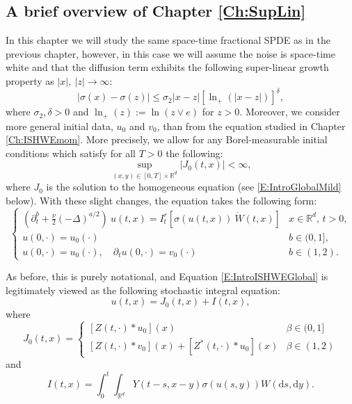 \documentclass[12pt]{report}
\theoremstyle{plain}
\theoremstyle{definition}
\numberwithin{equation}{section}
\newcommand{\R}{\mathbb{R}}
\newcommand{\ud}{\ensuremath{ \mathrm{d} }}
\begin{document}
\subsection{A brief overview of Chapter \ref{Ch:SupLin}}
In this chapter we will study the same space-time fractional SPDE as in the previous chapter, however, in this case we will assume the noise is space-time white and that the diffusion term exhibits the following super-linear growth property as $|x|,\: |z| \to \infty$:
\[
		|\sigma(x)-\sigma(z)| \le \sigma_2|x-z|[\ln_+(|x-z|)]^{\delta},
\]
where $\sigma_2, \delta >0$ and $\ln_+(z) := \ln(z \vee e)$ for $z >0$. Moreover, we consider more general initial data, $u_0$ and $v_0$, than from the equation studied in Chapter \ref{Ch:ISHWEmom}. More precisely, we allow for any Borel-measurable initial conditions which satisfy for all $T>0$ the following:
	\[
		\sup_{(x,y) \in [0,T] \times \R^d} |J_0(t,x)| < \infty, 
	\]
where $J_0$ is the solution to the homogeneous equation (see \eqref{E:IntroGlobalMild} below). With these slight changes, the equation takes the following form:
\begin{equation} \label{E:IntroISHWEGlobal}
\begin{cases}
\left(\partial^b_t + \frac{\nu}{2}(-\Delta)^{a/2}\right)\: u(t,x) = I^r_t \left[\sigma( u(t,x))\: \dot W(t,x) \right] & \text{$x\in \R^d$, $t>0$}, \\
u(0,\cdot) = u_0(\cdot)                                                                                                           & b \in (0,1],               \\
u(0,\cdot) = u_0(\cdot), \quad \partial_t u(0,\cdot) = v_0(\cdot)                                                                            & b \in (1,2).
\end{cases}
\end{equation}

As before, this is purely notational, and Equation \eqref{E:IntroISHWEGlobal} is legitimately viewed as the following stochastic integral equation:
	\begin{equation}\label{E:IntroGlobalMild}
u(t,x) = J_0(t,x) + I(t,x),
	\end{equation}
where
\[
J_0(t,x) =\begin{cases} 
[Z(t,\cdot)*u_0](x) & \beta \in (0,1]
\\	[Z(t,\cdot)*v_0](x) + [Z^*(t,\cdot)*u_0](x) & \beta \in (1,2)
\end{cases}
\]
and
\[
I(t,x) = \int_0^t \int_{\R^d} Y(t-s,x-y)\sigma(u(s,y)) W(\ud s, \ud y).
\]
\end{document}
